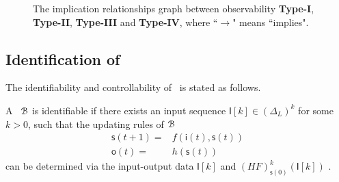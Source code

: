  \begin{figure}[thpb]
     \centering
      
     \caption{The implication relationships graph between observability {\bf Type-I}, {\bf Type-II}, {\bf Type-III} and {\bf Type-IV}, where ``$\rightarrow$" means ``implies".}
      \label{fig:9}
   \end{figure}




\subsection{Identification of \BCNs}

The identifiability and controllability of \BCNs\ is stated as follows. 
\begin{definition}[Identifiability]%
	A \BCN\ ${\mathcal{B}}$ is identifiable if there exists an input sequence $\mathsf{I}[k]\in(\Delta_L)^k$ for some $k>0$, such that the updating rules of ${\mathcal{B}}$
	\begin{equation*}
    		\begin{split}
		\mathsf{s}(t+1)=&f(\mathsf{i}(t),\mathsf{s}(t))\\
		\mathsf{o}(t)=&h(\mathsf{s}(t))
		\end{split}
	\end{equation*}
	can be determined via the input-output data $\mathsf{I}[k]$ and $(HF)^k_{\mathsf{s}(0)}(\mathsf{I}[k])$ \cite{Cheng2011Identification}.
\end{definition}

